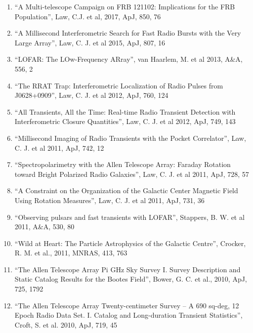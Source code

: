 \documentclass[11pt]{article}
\begin{document}
\begin{enumerate}
    \item ``A Multi-telescope Campaign on FRB 121102: Implications for the FRB Population'', Law, C.J. et al, 2017, ApJ, 850, 76

    \item ``A Millisecond Interferometric Search for Fast Radio Bursts with the Very Large Array'', Law, C. J. et al 2015, ApJ, 807, 16

    \item ``LOFAR: The LOw-Frequency ARray'', van Haarlem, M. et al 2013, A\&A, 556, 2

    \item ``The RRAT Trap: Interferometric Localization of Radio Pulses from J0628+0909'', Law, C. J. et al 2012, ApJ, 760, 124

    \item ``All Transients, All the Time: Real-time Radio Transient Detection with Interferometric Closure Quantities'',  Law, C. J. et al 2012, ApJ, 749, 143

    \item ``Millisecond Imaging of Radio Transients with the Pocket Correlator'',  Law, C. J. et al 2011, ApJ, 742, 12

    \item ``Spectropolarimetry with the Allen Telescope Array:  Faraday Rotation toward Bright Polarized Radio Galaxies'',  Law, C. J. et al 2011, ApJ, 728, 57

    \item ``A Constraint on the Organization of the Galactic Center Magnetic Field Using Rotation Measures'',  Law, C. J. et al 2011, ApJ, 731, 36

    \item ``Observing pulsars and fast transients with LOFAR'',  Stappers, B. W. et al 2011, A\&A, 530, 80

    \item ``Wild at Heart: The Particle Astrophysics of the Galactic Centre'',  Crocker, R. M. et al., 2011, MNRAS, 413, 763

    \item ``The Allen Telescope Array Pi GHz Sky Survey I. Survey Description and Static Catalog Results for the Bootes Field'',  Bower, G. C. et al., 2010, ApJ, 725, 1792  

    \item ``The Allen Telescope Array Twenty-centimeter Survey -- A 690 sq-deg, 12 Epoch Radio Data Set. I. Catalog and Long-duration Transient Statistics'',  Croft, S. et al. 2010, ApJ, 719, 45


\end{enumerate}
\end{document}
